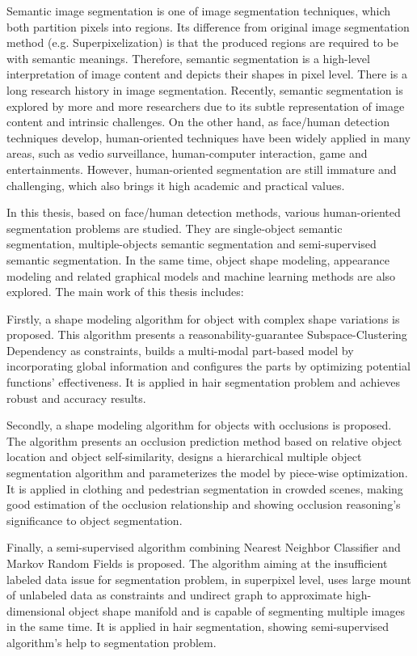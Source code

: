 \begin{eabstract}
   Semantic image segmentation is one of image segmentation techniques, which both partition pixels into regions. Its difference from original image segmentation method (e.g. Superpixelization) is that the produced regions are required to be with semantic meanings. Therefore, semantic segmentation is a high-level interpretation of image content and depicts their shapes in pixel level. There is a long research history in image segmentation. Recently, semantic segmentation is explored by more and more researchers due to its subtle representation of image content and intrinsic challenges. On the other hand, as face/human detection techniques develop, human-oriented techniques have been widely applied in many areas, such as vedio surveillance, human-computer interaction, game and entertainments. However, human-oriented segmentation are still immature and challenging, which also brings it high academic and practical values.
   
   In this thesis, based on face/human detection methods, various human-oriented segmentation problems are studied. They are single-object semantic segmentation, multiple-objects semantic segmentation and semi-supervised semantic segmentation. In the same time, object shape modeling, appearance modeling and related graphical models and machine learning methods are also explored. The main work of this thesis includes:
   
   Firstly, a shape modeling algorithm for object with complex shape variations is proposed. This algorithm presents a reasonability-guarantee Subspace-Clustering Dependency as constraints, builds a multi-modal part-based model by incorporating global information and configures the parts by optimizing potential functions' effectiveness. It is applied in hair segmentation problem and achieves robust and accuracy results.
   
   Secondly, a shape modeling algorithm for objects with occlusions is proposed. The algorithm presents an occlusion prediction method based on relative object location and object self-similarity, designs a hierarchical multiple object segmentation algorithm and parameterizes the model by piece-wise optimization. It is applied in clothing and pedestrian segmentation in crowded scenes, making good estimation of the occlusion relationship and showing occlusion reasoning's significance to object segmentation.
   
   Finally, a semi-supervised algorithm combining Nearest Neighbor Classifier and Markov Random Fields is proposed. The algorithm aiming at the insufficient labeled data issue for segmentation problem, in superpixel level, uses large mount of unlabeled data as constraints and undirect graph to approximate high-dimensional object shape manifold and is capable of segmenting multiple images in the same time. It is applied in hair segmentation, showing semi-supervised algorithm's help to segmentation problem.
\end{eabstract}

